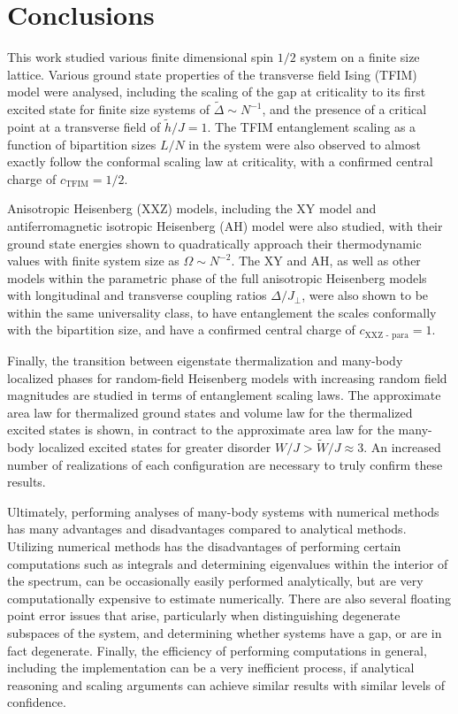 \documentclass[12pt]{article}{}
\begin{document}
\section*{Conclusions} \label{sec:conclusions}
This work studied various finite dimensional spin $1/2$ system on a finite size lattice. Various ground state properties of the transverse field Ising (TFIM) model were analysed, including the scaling of the gap at criticality to its first excited state for finite size systems of $\tilde{\Delta} \sim N^{-1}$, and the presence of a critical point at a transverse field of $\tilde{h}/J = 1$. The TFIM entanglement scaling as a function of bipartition sizes $L/N$ in the system were also observed to almost exactly follow the conformal scaling law at criticality, with a confirmed central charge of $c_{\textrm{TFIM}} = 1/2$. 

Anisotropic Heisenberg (XXZ) models, including the XY model and antiferromagnetic isotropic Heisenberg (AH) model were also studied, with their ground state energies shown to quadratically approach their thermodynamic values with finite system size as $\Omega \sim N^{-2}$. The XY and AH, as well as other models within the parametric phase of the full anisotropic Heisenberg models with longitudinal and transverse coupling ratios $\Delta/J_{\perp}$, were also shown to be within the same universality class, to have entanglement the scales conformally with the bipartition size, and have a confirmed central charge of $c_{\textrm{XXZ - para}} = 1$.

Finally, the transition between eigenstate thermalization and many-body localized phases for random-field Heisenberg models with increasing random field magnitudes are studied in terms of entanglement scaling laws. The approximate area law for thermalized ground states and volume law for the thermalized excited states is shown, in contract to the approximate area law for the many-body localized excited states for greater disorder $W/J > \tilde{W}/J \approx 3$. An increased number of realizations of each configuration are necessary to truly confirm these results.

Ultimately, performing analyses of many-body systems with numerical methods has many advantages and disadvantages compared to analytical methods. Utilizing numerical methods has the disadvantages of performing certain computations such as integrals and determining eigenvalues within the interior of the spectrum, can be occasionally easily performed analytically, but are very computationally expensive to estimate numerically. There are also several floating point error issues that arise, particularly when distinguishing degenerate subspaces of the system, and determining whether systems have a gap, or are in fact degenerate. Finally, the efficiency of performing computations in general, including the implementation can be a very inefficient process, if analytical reasoning and scaling arguments can achieve similar results with similar levels of confidence.
\end{document}
